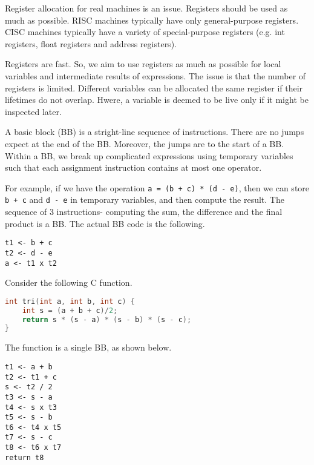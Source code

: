 \documentclass[a4paper, openany]{memoir}
\begin{document}
Register allocation for real machines is an issue. Registers should be used as much as possible. RISC machines typically have only general-purpose registers. CISC machines typically have a variety of special-purpose registers (e.g. int registers, float registers and address registers).

Registers are fast. So, we aim to use registers as much as possible for local variables and intermediate results of expressions. The issue is that the number of registers is limited. Different variables can be allocated the same register if their lifetimes do not overlap. Hwere, a variable is deemed to be live only if it might be inspected later.

A basic block (BB) is a stright-line sequence of instructions. There are no jumps expect at the end of the BB. Moreover, the jumps are to the start of a BB. Within a BB, we break up complicated expressions using temporary variables such that each assignment instruction contains at most one operator. 

For example, if we have the operation \texttt{a = (b + c) * (d - e)}, then we can store \texttt{b + c} and \texttt{d - e} in temporary variables, and then compute the result. The sequence of 3 instructions- computing the sum, the difference and the final product is a BB.
The actual BB code is the following.
\begin{lstlisting}
t1 <- b + c
t2 <- d - e
a <- t1 x t2
\end{lstlisting}

Consider the following C function.
\begin{lstlisting}[language=C]
int tri(int a, int b, int c) {
    int s = (a + b + c)/2;
    return s * (s - a) * (s - b) * (s - c);
}
\end{lstlisting}
The function is a single BB, as shown below.
\begin{lstlisting}
t1 <- a + b
t2 <- t1 + c
s <- t2 / 2
t3 <- s - a
t4 <- s x t3
t5 <- s - b
t6 <- t4 x t5
t7 <- s - c
t8 <- t6 x t7
return t8
\end{lstlisting}
\end{document}
